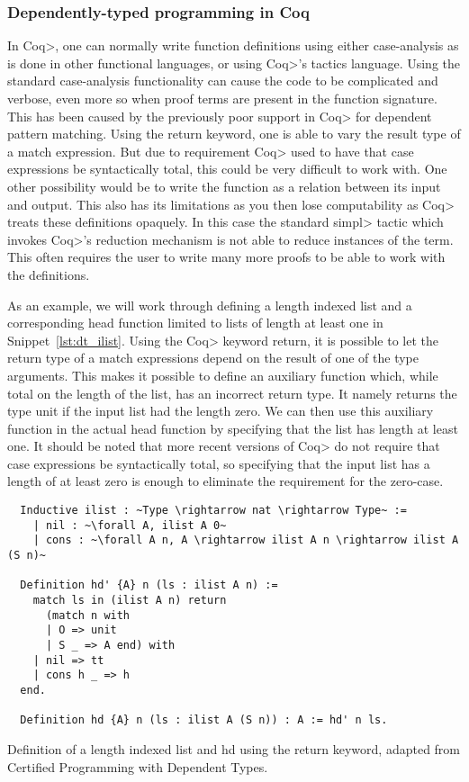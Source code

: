 \subsubsection{Dependently-typed programming in Coq}
In \<Coq>, one can normally write function definitions using either case-analysis as is done in other functional languages, or using \<Coq>'s tactics language.
Using the standard case-analysis functionality can cause the code to be complicated and verbose, even more so when proof terms are present in the function signature.
This has been caused by the previously poor support in \<Coq> for dependent pattern matching.
Using the return keyword, one is able to vary the result type of a match expression. But due to requirement \<Coq> used to have that case expressions be syntactically total, this could be very difficult to work with.
One other possibility would be to write the function as a relation between its input and output.
This also has its limitations as you then lose computability as \<Coq> treats these definitions opaquely. In this case the standard \<simpl> tactic which invokes \<Coq>'s reduction mechanism is not able to reduce instances of the term.
This often requires the user to write many more proofs to be able to work with the definitions.

As an example, we will work through defining a length indexed list and a corresponding head function limited to lists of length at least one in Snippet~\ref{lst:dt_ilist}.
Using the \<Coq> keyword return, it is possible to let the return type of a match expressions depend on the result of one of the type arguments.
This makes it possible to define an auxiliary function which, while total on the length of the list, has an incorrect return type. It namely returns the type unit if the input list had the length zero.
We can then use this auxiliary function in the actual head function by specifying that the list has length at least one.
It should be noted that more recent versions of \<Coq> do not require that case expressions be syntactically total, so specifying that the input list has a length of at least zero is enough to eliminate the requirement for the zero-case.

\begin{listing}
  \begin{verbatim}
  Inductive ilist : ~Type \rightarrow nat \rightarrow Type~ :=
    | nil : ~\forall A, ilist A 0~
    | cons : ~\forall A n, A \rightarrow ilist A n \rightarrow ilist A (S n)~

  Definition hd' {A} n (ls : ilist A n) :=
    match ls in (ilist A n) return
      (match n with
      | O => unit
      | S _ => A end) with
    | nil => tt
    | cons h _ => h
  end.

  Definition hd {A} n (ls : ilist A (S n)) : A := hd' n ls.
  \end{verbatim}
  \caption{Definition of a length indexed list and hd using the return keyword, adapted from Certified Programming with Dependent Types\cite{ChlipalaCPDT}.}
  \label{lst:dt_ilist}
\end{listing}

